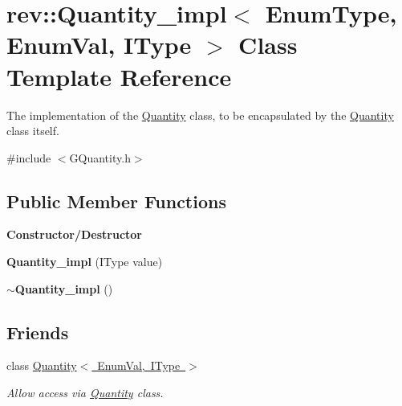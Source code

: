 \hypertarget{classrev_1_1_quantity__impl}{}\section{rev\+::Quantity\+\_\+impl$<$ Enum\+Type, Enum\+Val, I\+Type $>$ Class Template Reference}
\label{classrev_1_1_quantity__impl}


The implementation of the \mbox{\hyperlink{classrev_1_1_quantity}{Quantity}} class, to be encapsulated by the \mbox{\hyperlink{classrev_1_1_quantity}{Quantity}} class itself.  




{\ttfamily \#include $<$G\+Quantity.\+h$>$}

\subsection*{Public Member Functions}
\begin{Indent}\textbf{ Constructor/\+Destructor}\par
\begin{DoxyCompactItemize}
\item 
\mbox{\label{classrev_1_1_quantity__impl_adb41fb3d2d80498d165cdb8ad84413e3}} 
{\bfseries Quantity\+\_\+impl} (I\+Type value)
\item 
\mbox{\label{classrev_1_1_quantity__impl_a246999f7fc855dbf50f30550b807ba25}} 
{\bfseries $\sim$\+Quantity\+\_\+impl} ()
\end{DoxyCompactItemize}
\end{Indent}
\subsection*{Friends}
\begin{DoxyCompactItemize}
\item 
\mbox{\label{classrev_1_1_quantity__impl_a1968cf84a13fe433d5720b335305a46d}} 
class \mbox{\hyperlink{classrev_1_1_quantity__impl_a1968cf84a13fe433d5720b335305a46d}{Quantity$<$ Enum\+Val, I\+Type $>$}}
\begin{DoxyCompactList}\small\item\em Allow access via \mbox{\hyperlink{classrev_1_1_quantity}{Quantity}} class. \end{DoxyCompactList}\end{DoxyCompactItemize}


